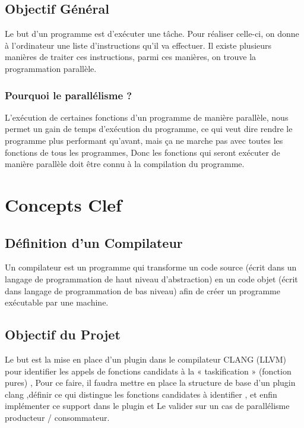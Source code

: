 \documentclass[12pt,titlepage]{article}
\begin{document}
 \subsection{Objectif Général}

Le but d'un programme est d'exécuter  une tâche. Pour réaliser celle-ci, on donne à l'ordinateur une liste d'instructions qu'il va effectuer. Il existe plusieurs manières de traiter ces instructions, parmi ces manières, on trouve la programmation parallèle.

\subsubsection{Pourquoi le parallélisme ?}

 L’exécution de  certaines fonctions d'un programme de manière parallèle, nous permet un gain de temps d'exécution du programme, ce qui veut dire rendre le programme plus performant qu'avant, mais ça ne marche pas avec toutes  les fonctions de tous les programmes, Donc  les fonctions qui seront exécuter de manière parallèle doit être connu à la compilation du programme.

\section{Concepts Clef}

\subsection{Définition d'un Compilateur} 

Un compilateur est un programme qui transforme un code source (écrit dans un langage de programmation de haut niveau d'abstraction) en un code objet (écrit dans langage de programmation de bas niveau) afin de créer un programme exécutable par une machine.

\subsection{Objectif du Projet}

Le but est la mise en place d’un plugin dans le compilateur CLANG (LLVM) pour identifier les appels de fonctions candidats à la « taskification » (fonction pures) , Pour ce faire, il faudra mettre en place la structure de base d’un plugin clang ,définir ce qui distingue les fonctions candidates à identifier , et enfin implémenter ce support dans le plugin et  Le valider sur un cas de parallélisme producteur / consommateur.
\end{document}
